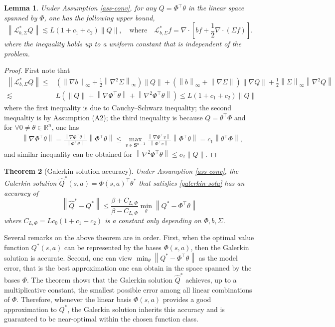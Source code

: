 \documentclass[12pt]{article}
\newtheorem{theorem}{Theorem}[section]
\newtheorem{lemma}[theorem]{Lemma}
\def\th{\theta}
\def\th{\theta}
\def\R{\mathbb R}
\def\mL{\mathcal{L}_{b,\Sigma}}
\def\l{\left}
\def\r{\right}
\def\ll{\left\lVert}
\def\rl{\right\rVert}
\def\nb{\nabla}
\begin{document}
\begin{lemma}\label{lemma:ineq}
Under Assumption \ref{ass-conv}, for any $Q = \Phi^\top \th$ in the linear space spanned by $\Phi$, one has the following upper bound,
\[
\ll \mL^*Q \rl \lesssim  L(1+c_1 + c_2)\ll Q \rl, \quad \text{where}\quad \mL^* f = \nb\cdot\l[ bf + \frac12\nb\cdot (\Sigma f)\r] .
\]
where the inequality holds up to a uniform constant that is independent of the problem. 
\end{lemma}
\begin{proof}
First note that
\[
\begin{aligned}
\ll \mL^*Q \rl
\leq &  \l(\ll \nb b\rl_\infty + \frac12\ll\nb^2 \Sigma\rl_\infty \r) \ll Q\rl + \l( \ll b \rl_\infty + \ll \nb\Sigma\rl\r)  \ll \nb Q\rl + \frac12\ll\Sigma\rl_\infty \ll \nb^2 Q  \rl \\
\lesssim& L \l(\ll Q  \rl + \ll \nb\Phi^\top \th\rl + \ll \nb^2\Phi^\top \th\rl \r) 
\leq L(1+c_1+c_2)\ll Q \rl
\end{aligned}    
\]
where the first inequality is due to Cauchy–Schwarz inequality; the second inequaltiy is by Assumption (A2); the third inequality is because $Q = \th^\top\Phi$ and for $\forall 0\neq \th\in \R^n$, one has
\[
\begin{aligned}
&\ll \nb\Phi^\top \th \rl =  \frac{\ll \nb\Phi^\top \th \rl }{\ll \Phi^\top \th \rl}  \ll \Phi^\top \th \rl \leq \max_{v\in \mathbf{S}^{n-1}} \frac{\ll \nb\Phi^\top v \rl }{\ll \Phi^\top v \rl}  \ll \Phi^\top \th \rl = c_1 \ll \th^\top \Phi \rl,
\end{aligned}
\] 
and similar inequality can be obtained for $\ll \nb^2\Phi^\top \th\rl \leq c_2 \ll Q \rl$.
\end{proof}


\color{black}
\begin{theorem}[Galerkin solution accuracy]\label{thm:galerkin}
Under Assumption \ref{ass-conv}, the Galerkin solution $\hat{Q}^*(s,a) = \Phi(s,a)^\top \th^*$ that satisfies \eqref{galerkin-solu} has an accuracy of
\[
\ll \hat{Q}^* - Q^* \rl \leq \frac{\beta + C_{L,\Phi}}{\beta - C_{L,\Phi}}  \min_{\th}\ll Q^* -\Phi^\top\th \rl
\]
where $C_{L,\Phi} = Lc_0(1+c_1+c_2)$ is a constant only depending on $\Phi, b, \Sigma$.
\end{theorem}

Several remarks on the above theorem are in order. First, when the optimal value function $Q^*(s,a)$ can be represented by the bases $\Phi(s,a)$, then the Galerkin solution is accurate. Second, one can view $\min_{\th} \ll Q^* - \Phi^\top \th \rl$ as the model error, that is the best approximation one can obtain in the space spanned by the bases $\Phi$. The theorem shows that the Galerkin solution $\hat{Q}^*$ achieves, up to a multiplicative constant, the smallest possible error among all linear combinations of $\Phi$. Therefore, whenever the linear basis $\Phi(s,a)$ provides a good approximation to $Q^*$, the Galerkin solution inherits this accuracy and is guaranteed to be near-optimal within the chosen function class. 
\end{document}
